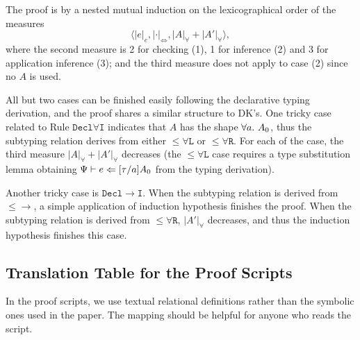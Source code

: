 The proof is by a nested mutual induction on the lexicographical order of the measures
$$\langle |e|_e, |\cdot|_\Leftrightarrow, |A|_\forall + |A'|_\forall \rangle,$$
where the second measure is 2 for checking (1), 1 for inference (2) and 3 for application inference (3);
and the third measure does not apply to case (2) since no $A$ is used.

All but two cases can be finished easily following the declarative typing derivation,
and the proof shares a similar structure to DK's.
One tricky case related to Rule $\mathtt{Decl\forall I}$ indicates that $A$ has the shape $\all A_0$,
thus the subtyping relation derives from either $\mathtt{{\le}\forall L}$ or $\mathtt{{\le}\forall R}$.
For each of the case, the third measure $|A|_\forall + |A'|_\forall$ decreases
(the $\mathtt{{\le}\forall L}$ case requires a type substitution lemma obtaining
$\Psi \vdash e \Leftarrow [\tau/a]A_0$ from the typing derivation).

Another tricky case is $\mathtt{Decl{\to}I}$.
When the subtyping relation is derived from $\mathtt{{\le}{\to}}$,
a simple application of induction hypothesis finishes the proof.
When the subtyping relation is derived from $\mathtt{{\le}\forall R}$,
$|A'|_\forall$ decreases, and thus the induction hypothesis finishes this case.

\subsection{Translation Table for the Proof Scripts}
In the proof scripts, we use textual relational definitions
rather than the symbolic ones used in the paper.
The mapping should be helpful for anyone who reads the script.


